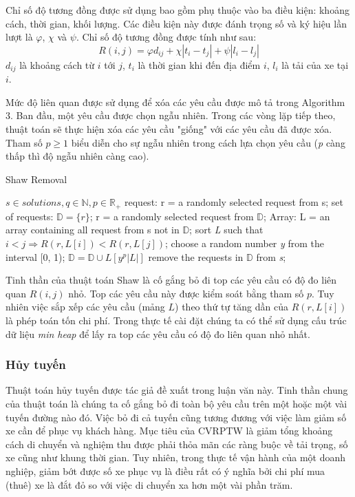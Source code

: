Chỉ số độ tương đồng được sử dụng bao gồm phụ thuộc vào ba điều kiện: khoảng cách, thời gian, khối lượng. Các điều kiện này được đánh trọng số và ký hiệu lần lượt là $\varphi$, $\chi$ và $\psi$. Chỉ số độ tương đồng được tính như sau:
\begin{equation}
  \label{eq:shaw_related}
  R(i,j) = \varphi d_{ij} + \chi |t_{i}-t_{j}| + \psi|l_i - l_j|
\end{equation}
$d_{ij}$ là khoảng cách từ $i$ tới $j$, $t_i$ là thời gian khi đến địa điểm $i$, $l_i$ là tải của xe tại $i$. 

Mức độ liên quan được sử dụng để xóa các yêu cầu được mô tả trong Algorithm 3. Ban đầu, một yêu cầu được chọn ngẫu nhiên. Trong các vòng lặp tiếp theo, thuật toán sẽ thực hiện xóa các yêu cầu "giống" với các yêu cầu đã được xóa. Tham số $p \geqslant 1$ biểu diễn cho sự ngẫu nhiên trong cách lựa chọn yêu cầu (\textit{p} càng thấp thì độ ngẫu nhiên càng cao).

\begin{algorithm}
	\caption{Shaw Removal} 
	\begin{algorithmic}[1]
        \Require $s \in {solutions}, q \in \mathbb{N}, p \in \mathbb{R}_{+}$
        \State request: r = a randomly selected request from s;
        \State set of requests: $\mathbb{D}=\{r\}$;
		  \State r = a randomly selected request from $\mathbb{D}$;
            \State Array: L = an array containing all request from s not in $\mathbb{D}$;
            \State sort \textit{L} such that $i<j \Rightarrow R(r, L\left[ i \right]) < R(r, L\left[ j \right])$;
            \State choose a random number \textit{y} from the interval [0, 1);
            \State $\mathbb{D}=\mathbb{D}\cup {L \left[ y^p|L| \right]}$
        \EndWhile
    \State remove the requests in $\mathbb{D}$ from \textit{s};
	\end{algorithmic} 
\end{algorithm}

Tinh thần của thuật toán Shaw là cố gắng bỏ đi top các yêu cầu có độ đo liên quan $R(i,j)$ nhỏ. Top các yêu cầu này được kiểm soát bằng tham số $p$. Tuy nhiên việc sắp xếp các yêu cầu (mảng $L$) theo thứ tự tăng dần của $R(r, L[i])$ là phép toán tốn chi phí. Trong thực tế cài đặt chúng ta có thể sử dụng cấu trúc dữ liệu \textit{min heap} để lấy ra top các yêu cầu có độ đo liên quan nhỏ nhất.

\subsubsection*{Hủy tuyến}
Thuật toán hủy tuyến được tác giả đề xuất trong luận văn này. Tinh thần chung của thuật toán là chúng ta cố gắng bỏ đi toàn bộ yêu cầu trên một hoặc một vài tuyến đường nào đó. Việc bỏ đi cả tuyến cũng tương đương với việc làm giảm số xe cần để phục vụ khách hàng. Mục tiêu của CVRPTW là giảm tổng khoảng cách di chuyển và nghiệm thu được phải thỏa mãn các ràng buộc về tải trọng, số xe cũng như khung thời gian. Tuy nhiên, trong thực tế vận hành của một doanh nghiệp, giảm bớt được số xe phục vụ là điều rất có ý nghĩa bởi chi phí mua (thuê) xe là đắt đỏ so với việc di chuyển xa hơn một vài phần trăm.

